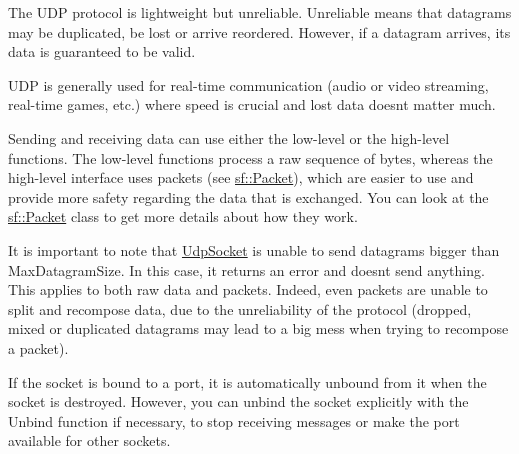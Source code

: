 The U\+DP protocol is lightweight but unreliable. Unreliable means that datagrams may be duplicated, be lost or arrive reordered. However, if a datagram arrives, its data is guaranteed to be valid.

U\+DP is generally used for real-\/time communication (audio or video streaming, real-\/time games, etc.) where speed is crucial and lost data doesn\textquotesingle{}t matter much.

Sending and receiving data can use either the low-\/level or the high-\/level functions. The low-\/level functions process a raw sequence of bytes, whereas the high-\/level interface uses packets (see \hyperlink{classsf_1_1_packet}{sf\+::\+Packet}), which are easier to use and provide more safety regarding the data that is exchanged. You can look at the \hyperlink{classsf_1_1_packet}{sf\+::\+Packet} class to get more details about how they work.

It is important to note that \hyperlink{classsf_1_1_udp_socket}{Udp\+Socket} is unable to send datagrams bigger than Max\+Datagram\+Size. In this case, it returns an error and doesn\textquotesingle{}t send anything. This applies to both raw data and packets. Indeed, even packets are unable to split and recompose data, due to the unreliability of the protocol (dropped, mixed or duplicated datagrams may lead to a big mess when trying to recompose a packet).

If the socket is bound to a port, it is automatically unbound from it when the socket is destroyed. However, you can unbind the socket explicitly with the Unbind function if necessary, to stop receiving messages or make the port available for other sockets.


